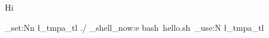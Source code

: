 \documentclass{article}
\begin{document}
Hi 

\ExplSyntaxOn
\tl_set:Nn \l_tmpa_tl {./}
\sys_shell_now:e { bash~hello.sh~\tl_use:N \l_tmpa_tl}
\ExplSyntaxOff
\end{document}
